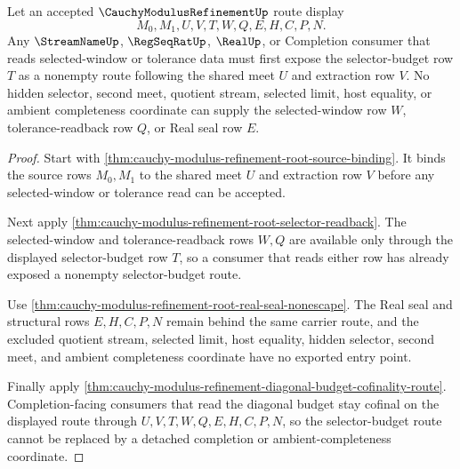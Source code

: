 \begin{theorem}
\label{thm:cauchy-modulus-refinement-selector-nonempty-route}
Let an accepted $\CauchyModulusRefinementUp$ route display
$$
M_0,M_1,U,V,T,W,Q,E,H,C,P,N.
$$
Any $\StreamNameUp$, $\RegSeqRatUp$, $\RealUp$, or Completion consumer that reads selected-window or tolerance data must first expose the selector-budget row $T$ as a nonempty route following the shared meet $U$ and extraction row $V$. No hidden selector, second meet, quotient stream, selected limit, host equality, or ambient completeness coordinate can supply the selected-window row $W$, tolerance-readback row $Q$, or Real seal row $E$.
\end{theorem}
\begin{proof}
Start with \autoref{thm:cauchy-modulus-refinement-root-source-binding}. It binds the source rows $M_0,M_1$ to the shared meet $U$ and extraction row $V$ before any selected-window or tolerance read can be accepted.

Next apply \autoref{thm:cauchy-modulus-refinement-root-selector-readback}. The selected-window and tolerance-readback rows $W,Q$ are available only through the displayed selector-budget row $T$, so a consumer that reads either row has already exposed a nonempty selector-budget route.

Use \autoref{thm:cauchy-modulus-refinement-root-real-seal-nonescape}. The Real seal and structural rows $E,H,C,P,N$ remain behind the same carrier route, and the excluded quotient stream, selected limit, host equality, hidden selector, second meet, and ambient completeness coordinate have no exported entry point.

Finally apply \autoref{thm:cauchy-modulus-refinement-diagonal-budget-cofinality-route}. Completion-facing consumers that read the diagonal budget stay cofinal on the displayed route through $U,V,T,W,Q,E,H,C,P,N$, so the selector-budget route cannot be replaced by a detached completion or ambient-completeness coordinate.
\end{proof}

